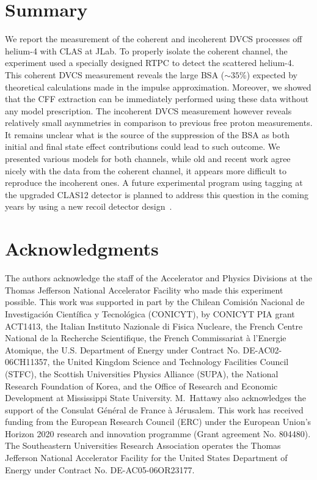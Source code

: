 \documentclass{article}
\begin{document}
\section{Summary}

We report the measurement of the coherent and incoherent DVCS processes off helium-4 with
CLAS at JLab. To properly isolate the coherent channel, the experiment used a specially 
designed RTPC to detect the scattered helium-4. This coherent 
DVCS measurement reveals the large BSA ($\sim 35$\%) expected by theoretical calculations
made in the impulse approximation. Moreover, we showed that the CFF extraction can be 
immediately performed using these data without any model prescription. The incoherent DVCS measurement 
however reveals relatively small asymmetries in comparison to previous free proton 
measurements. It remains unclear what is the source of the suppression of the BSA as both 
initial and final state effect contributions could lead to such outcome. We presented 
various models for both channels, while old and recent work agree nicely with the data
from the coherent channel, it appears more difficult to reproduce the incoherent ones.
A future experimental program using tagging at the upgraded CLAS12 detector is 
planned to address this question in the coming years by using a new recoil detector 
design~\cite{Armstrong:2017zcm}.

\section{Acknowledgments}
The authors acknowledge the staff of the Accelerator and Physics Divisions at 
the Thomas Jefferson National Accelerator Facility who made this experiment 
possible. This work was supported in part by the Chilean Comisi\'on Nacional de 
Investigaci\'on Cient\'ifica y Tecnol\'ogica (CONICYT), by CONICYT PIA grant 
ACT1413, the Italian Instituto Nazionale di Fisica Nucleare, the French Centre 
National de la Recherche Scientifique, the French Commissariat \`a l'Energie 
Atomique, the U.S. Department of Energy under Contract No. DE-AC02-06CH11357, 
the United Kingdom Science and Technology Facilities Council (STFC), the 
Scottish Universities Physics Alliance (SUPA), the National Research Foundation 
of Korea, and the Office of Research and Economic Development at Mississippi 
State University. M.~Hattawy also acknowledges the support of the Consulat 
G\'en\'eral de France \`a J\'erusalem. This work has received funding from 
the European Research Council (ERC) under the European Union’s Horizon 2020 
research and innovation programme (Grant agreement No. 804480). The Southeastern Universities Research 
Association operates the Thomas Jefferson National Accelerator Facility for the 
United States Department of Energy under Contract No. DE-AC05-06OR23177.
\end{document}
